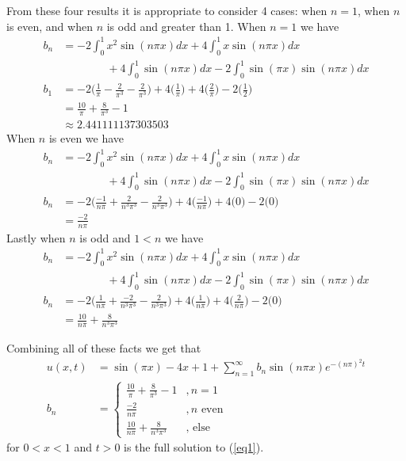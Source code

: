 \documentclass[12pt]{article}
\begin{document}
From these four results it is appropriate to consider 4 cases: when $n=1$, when $n$ is even, and when $n$ is odd and greater than 1. When $n = 1$ we have
\begin{align*}
	b_n & = -2\int_{0}^{1}x^2 \sin(n \pi x) dx + 4 \int_{0}^{1}x \sin(n \pi x) dx \\
	& \phantom{===} + 4 \int_{0}^{1} \sin(n \pi x) dx - 2\int_{0}^{1} \sin(\pi x)\sin(n \pi x) dx \\
	b_1 & = -2 \bigg( \frac{1}{\pi} - \frac{2}{\pi^3} - \frac{2}{\pi^3}\bigg) + 4 \bigg( \frac{1}{\pi} \bigg) + 4 \bigg( \frac{2}{\pi} \bigg) - 2 \bigg( \frac{1}{2} \bigg) \\
	& = \frac{10}{\pi} + \frac{8}{\pi^3} - 1 \\
	& \approx 2.441111137303503
\end{align*}
When $n$ is even we have
\begin{align*}
b_n & = -2\int_{0}^{1}x^2 \sin(n \pi x) dx + 4 \int_{0}^{1}x \sin(n \pi x) dx \\
& \phantom{===} + 4 \int_{0}^{1} \sin(n \pi x) dx - 2\int_{0}^{1} \sin(\pi x)\sin(n \pi x) dx \\
b_n & = -2 \bigg( \frac{-1}{n\pi} + \frac{2}{n^3\pi^3} - \frac{2}{n^3\pi^3}\bigg) + 4 \bigg( \frac{-1}{n\pi} \bigg) + 4 \bigg( 0 \bigg) - 2 \bigg( 0 \bigg) \\
& = \frac{-2}{n\pi}
\end{align*}
Lastly when $n$ is odd and $1<n$ we have
\begin{align*}
b_n & = -2\int_{0}^{1}x^2 \sin(n \pi x) dx + 4 \int_{0}^{1}x \sin(n \pi x) dx \\
& \phantom{===} + 4 \int_{0}^{1} \sin(n \pi x) dx - 2\int_{0}^{1} \sin(\pi x)\sin(n \pi x) dx \\
b_n & = -2 \bigg( \frac{1}{n\pi} + \frac{-2}{n^3\pi^3} - \frac{2}{n^3\pi^3}\bigg) + 4 \bigg( \frac{1}{n\pi} \bigg) + 4 \bigg( \frac{2}{n\pi} \bigg) - 2 \bigg( 0 \bigg) \\
& = \frac{10}{n\pi} + \frac{8}{n^3 \pi^3}
\end{align*}

Combining all of these facts we get that 
\begin{align*}
	u(x,t) & = \sin(\pi x) - 4x + 1 + \sum\limits_{n=1}^\infty b_n \sin(n \pi x)e^{-(n \pi)^2t} \\
	b_n & = \begin{cases}
			\frac{10}{\pi} + \frac{8}{\pi^3} - 1 &, n=1 \\
			\frac{-2}{n\pi} & , n \text{ even} \\
			\frac{10}{n\pi} + \frac{8}{n^3 \pi^3} & \text{, else}
		\end{cases}
\end{align*}
for $0<x<1$ and $t>0$ is the full solution to (\ref{eq1}).
\end{document}

